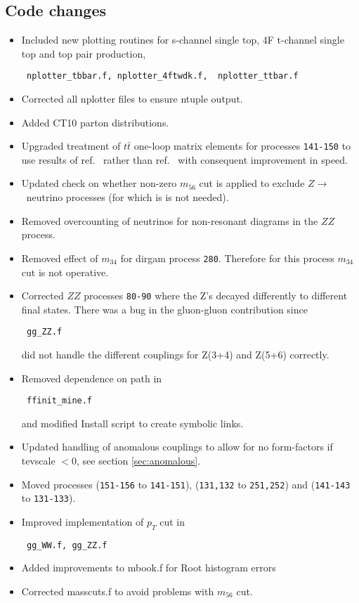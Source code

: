 \documentclass[12pt]{article}
\begin{document}
\subsection{Code changes}
\begin{itemize}
\item
Included new plotting routines for s-channel single top, 4F t-channel single top and
top pair production,
\begin{verbatim} nplotter_tbbar.f, nplotter_4ftwdk.f,  nplotter_ttbar.f
\end{verbatim}
\item
Corrected all nplotter files to ensure ntuple output.
\item
Added CT10 parton distributions.
\item
Upgraded treatment of $t \bar{t}$ one-loop matrix elements for processes {\tt 141-150} to use results of 
ref.~\cite{Badger:2011yu} rather than ref.~\cite{Korner:2002hy} with consequent improvement in speed.
\item
Updated check on whether non-zero $m_{56}$ cut is applied to exclude $Z \to$~neutrino processes (for which is is not needed). 
\item
Removed overcounting of neutrinos for non-resonant diagrams in the $ZZ$ process.
\item
Removed effect of $m_{34}$ for dirgam process {\tt 280}. 
Therefore for this process $m_{34}$ cut is not operative.
\item
Corrected $ZZ$ processes {\tt 80-90} where the Z's decayed differently
to different final states. 
There was a bug in the gluon-gluon contribution since \begin{verbatim} gg_ZZ.f \end{verbatim} did not handle the 
different couplings for Z(3+4) and Z(5+6) correctly.
\item
Removed dependence on path in \begin{verbatim} ffinit_mine.f \end{verbatim} and modified Install script 
to create symbolic links.
\item
Updated handling of anomalous couplings to allow for no form-factors if tevscale $< 0$, see section \ref{sec:anomalous}.
\item
Moved processes ({\tt 151-156} to {\tt 141-151}), ({\tt 131,132} to {\tt 251,252}) and ({\tt 141-143} to {\tt 131-133}).
\item
Improved implementation of $p_T$ cut in 
\begin{verbatim} gg_WW.f, gg_ZZ.f \end{verbatim}
\item
Added improvements to mbook.f for Root histogram errors
\item
Corrected masscuts.f to avoid problems with $m_{56}$ cut.
\end{itemize}
\end{document}
